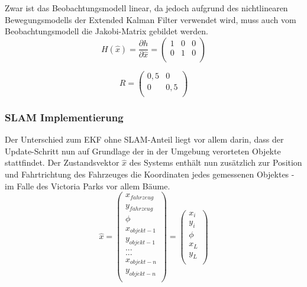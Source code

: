 \documentclass[11pt]{article}
\begin{document}
Zwar ist das Beobachtungsmodell linear, da jedoch aufgrund des nichtlinearen Bewegungsmodells der Extended Kalman Filter verwendet wird, muss auch vom Beobachtungsmodell die Jakobi-Matrix gebildet werden.
\begin{equation}\label{EKF-Observation-Model-Jakobi-Matrix}
	H(\hat{x})= \frac{\partial h}{\partial \hat{x}} = \begin{pmatrix}
		1 & 0 & 0 \\
		0 & 1 & 0 \\
	\end{pmatrix}
\end{equation}

\begin{equation}\label{GPS-Messungenauigkeits-Matrix}
	R = \begin{pmatrix}
		0,5 & 0 \\
		0 & 0,5 \\
	\end{pmatrix}
\end{equation}

\subsubsection{SLAM Implementierung}\label{SLAM Implementierung}
Der Unterschied zum EKF ohne SLAM-Anteil liegt vor allem darin, dass der Update-Schritt nun auf Grundlage der in der Umgebung verorteten Objekte stattfindet. Der Zustandsvektor $\hat{x}$ des Systems enthält nun zusätzlich zur Position und Fahrtrichtung des Fahrzeuges die Koordinaten jedes gemessenen Objektes - im Falle des Victoria Parks vor allem Bäume. 
\begin{equation}\label{SLAM-State-Vector}
	\hat{x} = \begin{pmatrix}
		x_{fahrzeug} \\
		y_{fahrzeug} \\
		\phi \\
		x_{objekt-1} \\
		y_{objekt-1} \\
		... \\
		... \\
		x_{objekt-n} \\
		y_{objekt-n} \\
	  \end{pmatrix} = \begin{pmatrix}
		  x_i \\
		  y_i \\
		  \phi \\
		  x_L \\
		  y_L \\
	  \end{pmatrix}
\end{equation}
\end{document}

